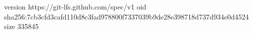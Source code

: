 version https://git-lfs.github.com/spec/v1
oid sha256:7cb3cfd3cafd110d8c3fad978800f7337039b9de28e398718d737d934e0d4524
size 335845
